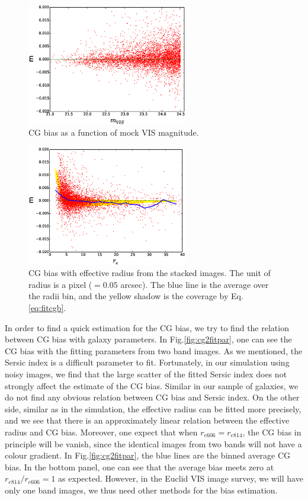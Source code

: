 \documentclass[useAMS,usenatbib]{mn2e}
\begin{document}
%
\begin{figure}
\includegraphics[width=7.0cm]{zcgb-magt16.eps}
\caption{CG bias as a function of mock VIS magnitude. }
\label{fig:cg2magvis}
\end{figure}
%
\begin{figure}
\includegraphics[width=7.0cm]{zcgb-ret16.eps}
\caption{CG bias with effective radius from the stacked images. The
  unit of radius is a pixel ($=0.05$ arcsec). The blue line is the
  average over the radii bin, and the yellow shadow is the coverage
  by Eq.\ref{eq:fitcgb}.}
\label{fig:cg2re}
\end{figure}
%
In order to find a quick estimation for the CG bias, we try to find
the relation between CG bias with galaxy parameters. In
Fig.\ref{fig:cg2fitpar}, one can see the CG bias with the fitting
parameters from two band images. As we mentioned, the Sersic index is
a difficult parameter to fit. Fortunately, in our simulation using
noisy images, we find that the large scatter of the fitted Sersic
index does not strongly affect the estimate of the CG bias. Similar in
our sample of galaxies, we do not find any obvious relation between CG
bias and Sersic index. On the other side, similar as in the
simulation, the effective radius can be fitted more precisely, and we
see that there is an approximately linear relation between the effective
radius and CG bias.  Moreover, one expect that when
$r_{e606}=r_{e814}$, the CG bias in principle will be vanish, since
the identical images from two bands will not have a colour gradient. In
Fig.\ref{fig:cg2fitpar}, the blue lines are the binned average CG
bias. In the bottom panel, one can see that the average bias meets
zero at $r_{e814}/r_{e606}=1$ as expected. However, in the Euclid VIS
image survey, we will have only one band images, we thus need other
methods for the bias estimation.
\end{document}
